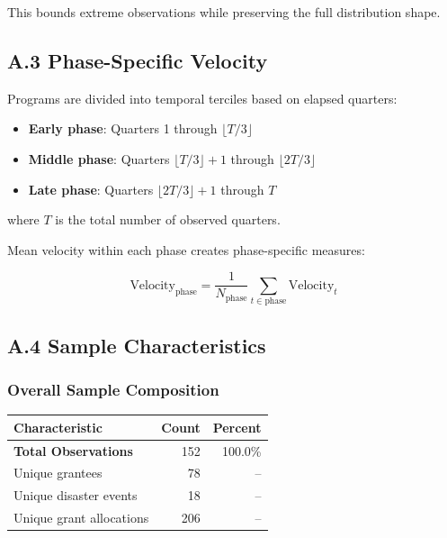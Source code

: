 \documentclass[
  12pt,
  letterpaper,
]{article}
\providecommand{\tightlist}{%
  \setlength{\itemsep}{0pt}\setlength{\parskip}{0pt}}
\begin{document}
This bounds extreme observations while preserving the full distribution
shape.

\subsection{A.3 Phase-Specific
Velocity}\label{a.3-phase-specific-velocity}

Programs are divided into temporal terciles based on elapsed quarters:

\begin{itemize}
\tightlist
\item
  \textbf{Early phase}: Quarters 1 through \(\lfloor T/3 \rfloor\)
\item
  \textbf{Middle phase}: Quarters \(\lfloor T/3 \rfloor + 1\) through
  \(\lfloor 2T/3 \rfloor\)
\item
  \textbf{Late phase}: Quarters \(\lfloor 2T/3 \rfloor + 1\) through
  \(T\)
\end{itemize}

where \(T\) is the total number of observed quarters.

Mean velocity within each phase creates phase-specific measures:

\[
\text{Velocity}_{\text{phase}} = \frac{1}{N_{\text{phase}}} \sum_{t \in \text{phase}} \text{Velocity}_t
\]

\subsection{A.4 Sample
Characteristics}\label{a.4-sample-characteristics}

\subsubsection{Overall Sample
Composition}\label{overall-sample-composition}

\begin{longtable}[]{@{}lrr@{}}
\toprule\noalign{}
\textbf{Characteristic} & \textbf{Count} & \textbf{Percent} \\
\midrule\noalign{}
\endhead
\bottomrule\noalign{}
\endlastfoot
\textbf{Total Observations} & 152 & 100.0\% \\
Unique grantees & 78 & -- \\
Unique disaster events & 18 & -- \\
Unique grant allocations & 206 & -- \\
\end{longtable}
\end{document}
